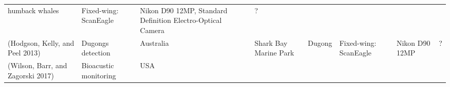 \documentclass[]{interact}
\theoremstyle{plain}%
\theoremstyle{definition}
\theoremstyle{remark}
\begin{document}
\begin{longtable}[]{@{}llllllll@{}}
\begin{minipage}[t]{0.10\columnwidth}
humback whales\strut
\end{minipage} & \begin{minipage}[t]{0.09\columnwidth}\raggedright\strut
Fixed-wing: ScanEagle\strut
\end{minipage} & \begin{minipage}[t]{0.11\columnwidth}\raggedright\strut
Nikon D90 12MP, Standard Definition Electro-Optical Camera\strut
\end{minipage} & \begin{minipage}[t]{0.01\columnwidth}\raggedright\strut
?\strut
\end{minipage}\tabularnewline
\begin{minipage}[t]{0.11\columnwidth}\raggedright\strut
(Hodgson, Kelly, and Peel 2013)\strut
\end{minipage} & \begin{minipage}[t]{0.18\columnwidth}\raggedright\strut
Dugongs detection\strut
\end{minipage} & \begin{minipage}[t]{0.03\columnwidth}\raggedright\strut
Australia\strut
\end{minipage} & \begin{minipage}[t]{0.14\columnwidth}\raggedright\strut
Shark Bay Marine Park\strut
\end{minipage} & \begin{minipage}[t]{0.10\columnwidth}\raggedright\strut
Dugong\strut
\end{minipage} & \begin{minipage}[t]{0.09\columnwidth}\raggedright\strut
Fixed-wing: ScanEagle\strut
\end{minipage} & \begin{minipage}[t]{0.11\columnwidth}\raggedright\strut
Nikon D90 12MP\strut
\end{minipage} & \begin{minipage}[t]{0.01\columnwidth}\raggedright\strut
?\strut
\end{minipage}\tabularnewline
\begin{minipage}[t]{0.11\columnwidth}\raggedright\strut
(Wilson, Barr, and Zagorski 2017)\strut
\end{minipage} & \begin{minipage}[t]{0.18\columnwidth}\raggedright\strut
Bioacustic monitoring\strut
\end{minipage} & \begin{minipage}[t]{0.03\columnwidth}\raggedright\strut
USA\strut
\end{minipage} & \begin{minipage}[t]{0.14\columnwidth}\raggedright\strut

\end{minipage}
\end{longtable}
\end{document}

